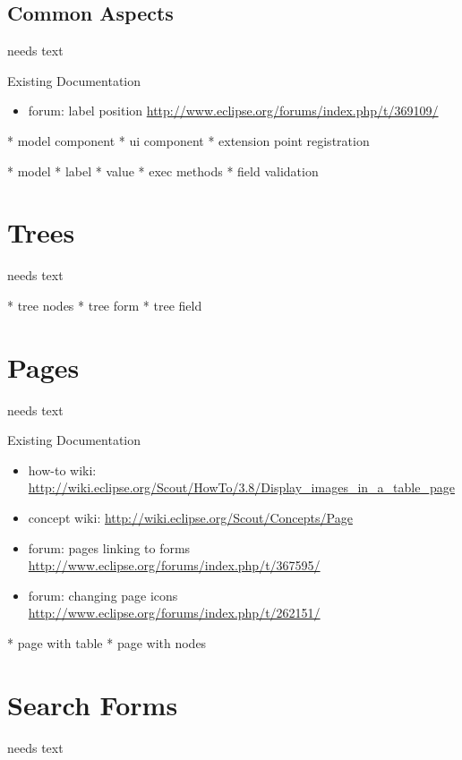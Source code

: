 \documentclass[a4paper,10pt,twoside]{book}
\begin{document}
{%
\subsection{Common Aspects}
needs text

\noindent Existing Documentation
\begin{itemize}
  \item forum: label position \url{http://www.eclipse.org/forums/index.php/t/369109/}
\end{itemize}

* model component
* ui component
* extension point registration

* model
* label
* value
* exec methods
* field validation

\section{Trees}
needs text

    * tree nodes
	* tree form
	* tree field

	
\section{Pages}
needs text

\noindent Existing Documentation
\begin{itemize}
  \item how-to wiki: \url{http://wiki.eclipse.org/Scout/HowTo/3.8/Display_images_in_a_table_page}	
  \item concept wiki: \url{http://wiki.eclipse.org/Scout/Concepts/Page}
  \item forum: pages linking to forms \url{http://www.eclipse.org/forums/index.php/t/367595/}
  \item forum: changing page icons \url{http://www.eclipse.org/forums/index.php/t/262151/}
\end{itemize}

    * page with table
	* page with nodes

	
\section{Search Forms}
needs text

}
\end{document}
